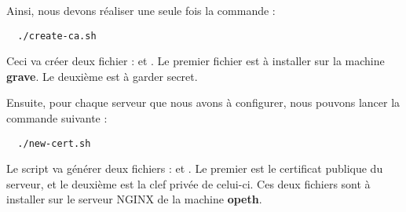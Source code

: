 \inputminted[bgcolor=lbcolor, breaklines]{shell}{../CA/new-cert.sh}

Ainsi, nous devons réaliser une seule fois la commande :

\begin{verbatim}
  ./create-ca.sh
\end{verbatim}

Ceci va créer deux fichier :  et . Le premier fichier est à installer sur la machine \textbf{grave}. Le deuxième est à garder secret.

Ensuite, pour chaque serveur que nous avons à configurer, nous pouvons lancer la commande suivante :

\begin{verbatim}
  ./new-cert.sh
\end{verbatim}

Le script va générer deux fichiers :  et . Le premier est le certificat publique du serveur, et le deuxième est la clef privée de celui-ci. Ces deux fichiers sont à installer sur le serveur NGINX de la machine \textbf{opeth}.
